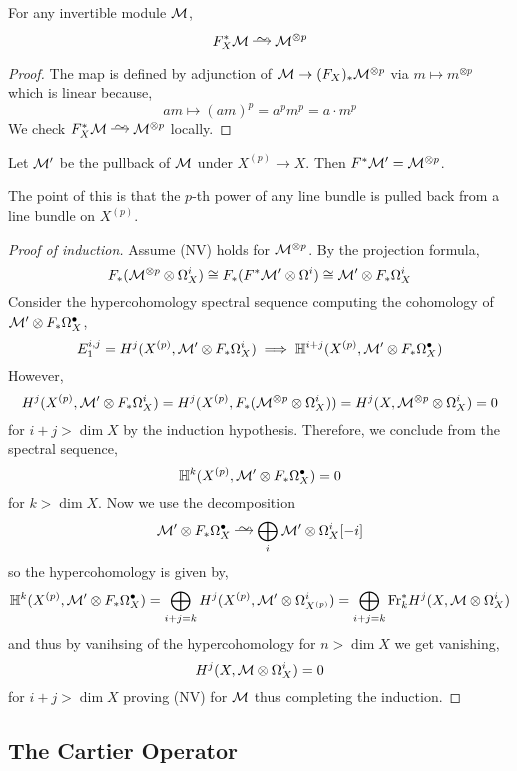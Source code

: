 \documentclass[12pt]{article}
\begin{document}
\begin{lemma}
For any invertible module $\mathcal{M}$,
\[ F_X^* \M \iso \M^{\otimes p} \]
\end{lemma}

\begin{proof}
The map is defined by adjunction of $\mathcal{M} \to (F_X)_* \mathcal{M}^{\otimes p}$ via $m \mapsto m^{\otimes p}$ which is linear because,
\[ am \mapsto (am)^p = a^p m^p = a \cdot m^p \]
We check $F_X^* \M \iso \M^{\ot p}$ locally.
\end{proof}

\begin{cor}
Let $\mathcal{M}'$ be the pullback of $\mathcal{M}$ under $X^{(p)} \to X$. Then $F^* \mathcal{M}' = \mathcal{M}^{\otimes p}$. 
\end{cor}

\begin{rmk}
The point of this is that the $p$-th power of any line bundle is pulled back from a line bundle on $X^{(p)}$.
\end{rmk}

\begin{proof}[Proof of induction]
Assume (NV) holds for $\mathcal{M}^{\otimes p}$. By the projection formula,
\[ F_*(\mathcal{M}^{\otimes p} \otimes \Omega^i_X) \cong F_*(F^* \mathcal{M}' \otimes \Omega^i) \cong \mathcal{M}' \otimes F_* \Omega_X^i \] 
Consider the hypercohomology spectral sequence computing the cohomology of $\mathcal{M}' \otimes F_* \Omega_X^\bullet$,
\[ E^{i,j}_1 = H^j(X^{(p)}, \mathcal{M}' \otimes F_* \Omega^i_X) \implies \mathbb{H}^{i+j}(X^{(p)}, \mathcal{M}' \otimes F_* \Omega^\bullet_X) \]
However,
\[ H^j(X^{(p)}, \mathcal{M}' \otimes F_* \Omega^i_X) = H^j(X^{(p)}, F_*(\mathcal{M}^{\otimes p} \otimes \Omega_X^i)) = H^j(X, \mathcal{M}^{\otimes p} \otimes \Omega^i_X) = 0 \]
for $i + j > \dim{X}$ by the induction hypothesis. Therefore, we conclude from the spectral sequence,
\[ \mathbb{H}^{k}(X^{(p)}, \mathcal{M}' \otimes F_* \Omega^\bullet_X) = 0 \]
for $k > \dim{X}$. Now we use the decomposition
\[ \M' \ot F_* \Omega^\bullet_X \iso \bigoplus_{i} \M' \otimes \Omega^i_X [-i] \]
so the hypercohomology is given by,
\[ \mathbb{H}^k(X^{(p)}, \mathcal{M}' \otimes F_* \Omega_X^\bullet) = \bigoplus_{i + j = k} H^j(X^{(p)}, \mathcal{M}' \otimes \Omega^i_{X^{(p)}}) = \bigoplus_{i + j = k} \mathrm{Fr}_k^* H^j(X, \mathcal{M} \otimes \Omega^i_X) \]
and thus by vanihsing of the hypercohomology for $n > \dim{X}$ we get vanishing,
\[ H^j(X, \mathcal{M} \otimes \Omega^i_{X}) = 0 \]
for $i + j > \dim{X}$ proving (NV) for $\mathcal{M}$ thus completing the induction.
\end{proof}


\subsection{The Cartier Operator}
\end{document}
